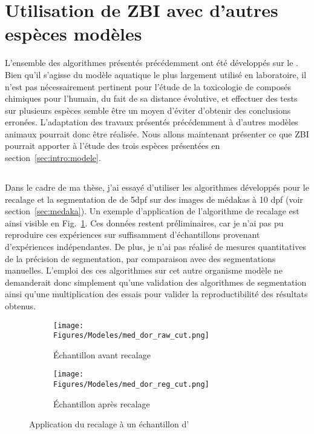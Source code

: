 \documentclass[\main/main.tex]{subfiles}
\begin{document}
                    
\section{\label{sec:modeles}Utilisation de ZBI avec d'autres espèces modèles}

%
L'ensemble des algorithmes présentés précédemment ont été développés sur le \pz.
%
Bien qu'il s'agisse du modèle aquatique le plus largement utilisé en laboratoire, il n'est pas nécessairement pertinent pour l'étude de la toxicologie de composés chimiques pour l'humain, du fait de sa distance évolutive, et effectuer des tests sur plusieurs espèces semble être un moyen d'éviter d'obtenir des conclusions erronées.
%
L'adaptation des travaux présentés précédemment à d'autres modèles animaux pourrait donc être réalisée.
%
Nous allons maintenant présenter ce que ZBI pourrait apporter à l'étude des trois espèces présentées en section~\ref{sec:intro:modele}.

    \subsection{\ol}

%
Dans le cadre de ma thèse, j'ai essayé d'utiliser les algorithmes développés pour le recalage
et la segmentation de \pz{} de 5dpf sur des images de médakas à 10 dpf (voir section~\ref{sec:medaka}).
%
Un exemple d'application de l'algorithme de recalage est ainsi visible en Fig.~\ref{fig:model:oz:reg}.
%
Ces données restent préliminaires, car je n'ai pas pu reproduire ces expériences sur suffisamment d'échantillons provenant d'expériences indépendantes. De plus, je n'ai pas réalisé de mesures quantitatives de la précision de segmentation, par comparaison avec des segmentations manuelles.
%
L'emploi des ces algorithmes sur cet autre organisme modèle ne demanderait donc simplement qu'une validation des algorithmes de segmentation ainsi qu'une multiplication des essais pour valider la reproductibilité des résultats obtenus.

\begin{figure}[htbp]
    \centering
    \begin{subfigure}[b]{0.475\textwidth}
       \caption{
            Échantillon avant recalage
            }
       \centering \texttt{[image: \\Figures/Modeles/med\_dor\_raw\_cut.png]}
    \end{subfigure}
    \begin{subfigure}[b]{0.475\textwidth}
       \caption{
            Échantillon après recalage
            }
       \centering \texttt{[image: \\Figures/Modeles/med\_dor\_reg\_cut.png]}
    \end{subfigure}
    \caption{
        \label{fig:model:oz:reg}
        Application du recalage à un échantillon d'\ol{}
        }
\end{figure}
\end{document}
